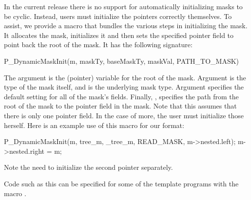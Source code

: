 In the current release there is no support for automatically
initializing masks to be cyclic. Instead, users must initialize the
pointers correctly themselves. To assist, we provide a macro that
bundles the various steps in initializing the mask. It allocates the
mask, initializes it and then sets the specified pointer field to
point back the root of the mask. It has the following signature:

\begin{code}
P_DynamicMaskInit(m, maskTy, baseMaskTy, maskVal, PATH_TO_MASK)
\end{code}

The argument  is the (pointer) variable for the root of
the mask. Argument  is the type of the mask itself, and
 is the underlying mask type. Argument 
specifies the default setting for all of the mask's fields. Finally,
, specifies the path from the root of the mask to
the pointer field in the mask. Note that this assumes that there is
only one pointer field. In the case of more, the user must initialize
those herself. Here is an example use of this macro for our 
format:
\begin{code}
P_DynamicMaskInit(m, tree_m, _tree_m, READ_MASK, m->nested.left);
m->nested.right = m;
\end{code}
Note the need to initialize the second pointer separately. 

Code such as this can be specified for some of the template programs
with the macro .

